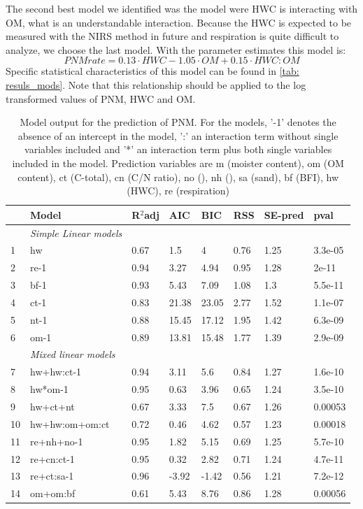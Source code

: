 \documentclass[10pt,twoside,dutch,english]{report}
\begin{document}
 The second best model we identified was the model were HWC is interacting with OM, what is an understandable interaction.  Because the HWC is expected to be measured with the NIRS method in future \citep{Vasques2009} and respiration is quite difficult to analyze, we choose the last model. With the parameter estimates this model is: 
\begin{equation} %
PNM rate = 0.13\cdot HWC -1.05\cdot OM +0.15\cdot HWC:OM
\label{eq: model}
\end{equation}
Specific statistical characteristics of this model can be found in \ref{tab: resuls_mods}. Note that this relationship should be applied to the log transformed values of PNM, HWC and OM. 

\begin{table}[hb] %
		\caption{Model output for the prediction of PNM. For the models,  '-1' denotes the absence of an intercept in the model,  ':' an interaction term without single variables included and '*' an interaction term plus both single variables included in the model. Prediction variables are m (moister content), om (OM content), ct (C-total), cn (C/N ratio), no (), nh (), sa (sand), bf (BFI), hw (HWC), re (respiration)}
		\footnotesize 
		\renewcommand{\arraystretch}{1.2}
		
		\begin{tabu} to \textwidth{X[1,l]X[3,l]X[1,r]X[1,r]X[1,r]X[1,r]X[1,r]X[1,r]}
			\toprule \rowfont{\bfseries}
 & Model & R$^2$adj & AIC & BIC & RSS & SE-pred & pval \\ 
 \midrule
&\textit{Simple Linear models}& & & & & & \\
1 & hw & 0.67 & 1.5 & 4 & 0.76 & 1.25 & 3.3e-05 \\ 
2 & re-1 & 0.94 & 3.27 & 4.94 & 0.95 & 1.28 & 2e-11 \\ 
3 & bf-1 & 0.93 & 5.43 & 7.09 & 1.08 & 1.3 & 5.5e-11 \\ 
4 & ct-1 & 0.83 & 21.38 & 23.05 & 2.77 & 1.52 & 1.1e-07 \\ 
5 & nt-1 & 0.88 & 15.45 & 17.12 & 1.95 & 1.42 & 6.3e-09 \\ 
6 & om-1 & 0.89 & 13.81 & 15.48 & 1.77 & 1.39 & 2.9e-09 \\   \addlinespace[0.5cm]
&\textit{Mixed linear models}& & & & & & \\
 7 & hw+hw:ct-1 & 0.94 & 3.11 & 5.6 & 0.84 & 1.27 & 1.6e-10 \\ 
 8 & hw*om-1 & 0.95 & 0.63 & 3.96 & 0.65 & 1.24 & 3.5e-10 \\ 
 9 & hw+ct+nt & 0.67 & 3.33 & 7.5 & 0.67 & 1.26 & 0.00053 \\ 
 10 & hw+hw:om+om:ct & 0.72 & 0.46 & 4.62 & 0.57 & 1.23 & 0.00018 \\ 
 11 & re+nh+no-1 & 0.95 & 1.82 & 5.15 & 0.69 & 1.25 & 5.7e-10 \\ 
 12 & re+cn:ct-1 & 0.95 & 0.32 & 2.82 & 0.71 & 1.24 & 4.7e-11 \\ 
 13 & re+ct:sa-1 & 0.96 & -3.92 & -1.42 & 0.56 & 1.21 & 7.2e-12 \\ 
 14 & om+om:bf & 0.61 & 5.43 & 8.76 & 0.86 & 1.28 & 0.00056 \\
\bottomrule
			

\end{tabu}
\end{table}
\end{document}
